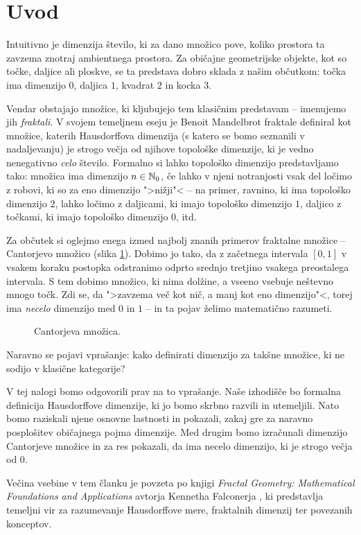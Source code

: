 \section{Uvod}
Intuitivno je dimenzija število, ki za dano množico pove, koliko prostora ta zavzema znotraj ambientnega prostora. Za običajne geometrijske objekte, kot so točke, daljice ali ploskve, se ta predstava dobro sklada z našim občutkom: točka ima dimenzijo \(0\), daljica \(1\), kvadrat \(2\) in kocka \(3\).

Vendar obstajajo množice, ki kljubujejo tem klasičnim predstavam -- imenujemo jih \emph{fraktali}. V svojem temeljnem eseju \cite{zbMATH03794378} je Benoit Mandelbrot fraktale definiral kot množice, katerih Hausdorffova dimenzija (s katero se bomo seznanili v nadaljevanju) je strogo večja od njihove topološke dimenzije, ki je vedno nenegativno \emph{celo} število. Formalno si lahko topološko dimenzijo predstavljamo tako: množica ima dimenzijo \(n \in \mathbb{N}_0\), če lahko v njeni notranjosti vsak del ločimo z robovi, ki so za eno dimenzijo ">nižji"< -- na primer, ravnino, ki ima topološko dimenzijo \(2\), lahko ločimo z daljicami, ki imajo topološko dimenzijo \(1\), daljico z točkami, ki imajo topološko dimenzijo \(0\), itd.

Za občutek si oglejmo enega izmed najbolj znanih primerov fraktalne množice -- Cantorjevo množico (slika \ref{fig:cantor-set}). Dobimo jo tako, da z začetnega intervala \([0,1]\) v vsakem koraku postopka odstranimo odprto srednjo tretjino vsakega preostalega intervala. S tem dobimo množico, ki nima dolžine, a vseeno vsebuje neštevno mnogo točk. Zdi se, da ">zavzema več kot nič, a manj kot eno dimenzijo"<, torej ima \emph{necelo} dimenzijo med \(0\) in \(1\) -- in ta pojav želimo matematično razumeti.

\begin{figure}[ht]
    \centering
    \caption{Cantorjeva množica.}
    \label{fig:cantor-set}
\end{figure}

Naravno se pojavi vprašanje: kako definirati dimenzijo za takšne množice, ki ne sodijo v klasične kategorije?

V tej nalogi bomo odgovorili prav na to vprašanje. Naše izhodišče bo formalna definicija Hausdorffove dimenzije, ki jo bomo skrbno razvili in utemeljili. Nato bomo raziskali njene osnovne lastnosti in pokazali, zakaj gre za naravno posplošitev običajnega pojma dimenzije. Med drugim bomo izračunali dimenzijo Cantorjeve množice in za res pokazali, da ima necelo dimenzijo, ki je strogo večja od \(0\).

Večina vsebine v tem članku je povzeta po knjigi \emph{Fractal Geometry: Mathematical Foundations and Applications} avtorja Kennetha Falconerja \cite{fk-fg}, ki predstavlja temeljni vir za razumevanje Hausdorffove mere, fraktalnih dimenzij ter povezanih konceptov.